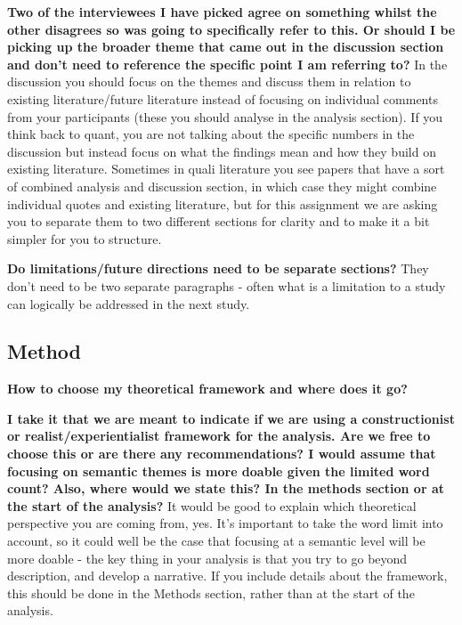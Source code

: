 \documentclass[
  english,
  letterpaper,
  DIV=11,
  numbers=noendperiod]{scrreprt}
\begin{document}
\textbf{Two of the interviewees I have picked agree on something whilst
the other disagrees so was going to specifically refer to this. Or
should I be picking up the broader theme that came out in the discussion
section and don't need to reference the specific point I am referring
to?} In the discussion you should focus on the themes and discuss them
in relation to existing literature/future literature instead of focusing
on individual comments from your participants (these you should analyse
in the analysis section). If you think back to quant, you are not
talking about the specific numbers in the discussion but instead focus
on what the findings mean and how they build on existing literature.
Sometimes in quali literature you see papers that have a sort of
combined analysis and discussion section, in which case they might
combine individual quotes and existing literature, but for this
assignment we are asking you to separate them to two different sections
for clarity and to make it a bit simpler for you to structure.

\textbf{Do limitations/future directions need to be separate sections?}
They don't need to be two separate paragraphs - often what is a
limitation to a study can logically be addressed in the next study.

\subsection{Method}\label{method}

\textbf{How to choose my theoretical framework and where does it go?}

\textbf{I take it that we are meant to indicate if we are using a
constructionist or realist/experientialist framework for the analysis.
Are we free to choose this or are there any recommendations? I would
assume that focusing on semantic themes is more doable given the limited
word count? Also, where would we state this? In the methods section or
at the start of the analysis?} It would be good to explain which
theoretical perspective you are coming from, yes. It's important to take
the word limit into account, so it could well be the case that focusing
at a semantic level will be more doable - the key thing in your analysis
is that you try to go beyond description, and develop a narrative. If
you include details about the framework, this should be done in the
Methods section, rather than at the start of the analysis.
\end{document}
